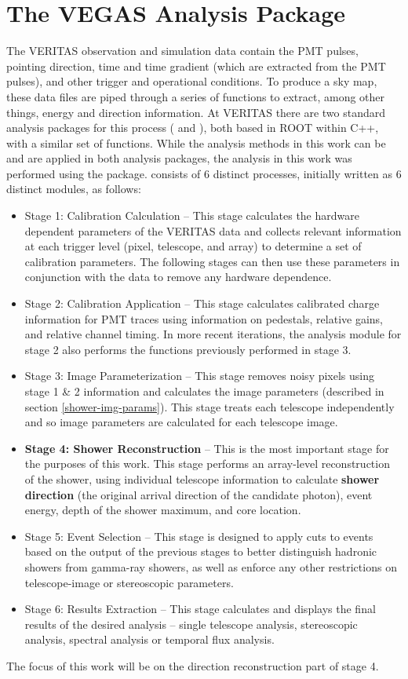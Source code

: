 \documentclass[main.tex]{subfiles}
\begin{document}
\section{The VEGAS Analysis Package}
The VERITAS observation and simulation data contain the PMT pulses, pointing direction, time and time gradient (which are extracted from the PMT pulses), and other trigger and operational conditions. To produce a sky map, these data files are piped through a series of functions to extract, among other things, energy and direction information. At VERITAS there are two standard analysis packages for this process (\vegas \cite{Cogan:2007ez} and \ed \cite{Maier:2017wzr}), both based in ROOT \cite{root_web} within C++, with a similar set of functions. While the analysis methods in this work can be and are applied in both analysis packages, the analysis in this work was performed using the \vegas package.
\vegas consists of 6 distinct processes, initially written as 6 distinct modules, as follows:
\begin{itemize}
\item Stage 1: Calibration Calculation -- This stage calculates the hardware dependent parameters of the VERITAS data and collects relevant information at each trigger level (pixel, telescope, and array) to determine a set of calibration parameters. The following stages can then use these parameters in conjunction with the data to remove any hardware dependence.
\item Stage 2: Calibration Application -- This stage calculates calibrated charge information for PMT traces using information on pedestals, relative gains, and relative channel timing. In more recent iterations, the analysis module for stage 2 also performs the functions previously performed in stage 3. 
\item Stage 3: Image Parameterization -- This stage removes noisy pixels using stage 1 \& 2 information and calculates the image parameters (described in section \ref{shower-img-params}). This stage treats each telescope independently and so image parameters are calculated for each telescope image.
\item \textbf{Stage 4: Shower Reconstruction} -- This is the most important stage for the purposes of this work. This stage performs an array-level reconstruction of the shower, using individual telescope information to calculate \textbf{shower direction} (the original arrival direction of the candidate photon), event energy, depth of the shower maximum, and core location.
\item Stage 5: Event Selection -- This stage is designed to apply cuts to events based on the output of the previous stages to better distinguish hadronic showers from gamma-ray showers, as well as enforce any other restrictions on telescope-image or stereoscopic parameters.
\item Stage 6: Results Extraction -- This stage calculates and displays the final results of the desired analysis -- single telescope analysis, stereoscopic analysis, spectral analysis or temporal flux analysis.
\end{itemize}
The focus of this work will be on the direction reconstruction part of stage 4.
\end{document}
